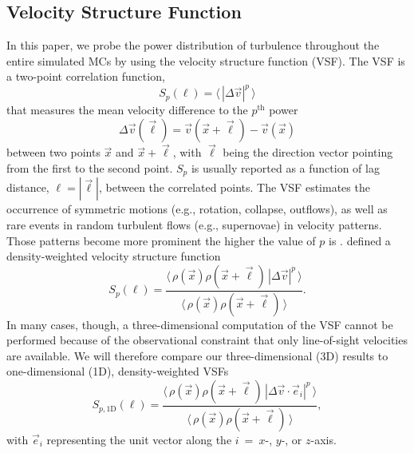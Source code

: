 \documentclass{aa}		%
\begin{document}
\subsection{Velocity Structure Function}\label{methods:vsf}

In this paper, we probe the power distribution of turbulence throughout the entire simulated MCs by using the velocity structure function (VSF).
The VSF is a two-point correlation function,
\begin{equation}
	{S}_p (\ell) = \langle \, |\Delta \vec{v}|^p  \, \rangle
	\label{equ:method:def_vsf}
\end{equation}
that measures the mean velocity difference to the $p^\mathrm{th}$ power
\begin{equation}\Delta \vec{v} (\vec{\ell}) = \vec{v}(\vec{x}+\vec{\ell}) - \vec{v}(\vec{x})
\end{equation} 
between two points $\vec{x}$ and $\vec{x}+\vec{\ell}$, with $\vec{\ell}$ being the direction vector pointing from the first to the second point.  
$S_p$ is usually reported as a function of lag distance, $\ell = |\vec{\ell}|$, between the correlated points.
The VSF estimates the occurrence of symmetric motions (e.g., rotation, collapse, outflows), as well as rare events in random turbulent flows (e.g., supernovae) in velocity patterns.
Those patterns become more prominent the higher the value of $p$ is \citep{Heyer2004}.
\citet{Padoan2016a} defined a density-weighted velocity structure function
\begin{equation}
	{S}_p (\ell) = \frac{\langle \, \rho(\vec{x}) \rho(\vec{x}+\vec{\ell}) \, |\Delta \vec{v}|^p  \, \rangle}{\langle  \, \rho(\vec{x}) \rho(\vec{x}+\vec{\ell}) \, \rangle}.
	\label{equ:method:def_vsf_dw}
\end{equation}
In many cases, though, a three-dimensional computation of the VSF cannot be performed because of the observational constraint that only line-of-sight velocities are available.
We will therefore compare our three-dimensional (3D) results to one-dimensional (1D), density-weighted VSFs
\begin{equation}
	\mathit{S}_{p,\mathrm{1D}} (\ell) = \frac{\langle \, \rho(\vec{x}) \rho(\vec{x}+\vec{\ell}) \, |\Delta 
        \vec{v} \cdot \vec{e}_i|^p  \, \rangle}{\langle  \, \rho(\vec{x}) \rho(\vec{x}+\vec{\ell}) \, \rangle} ,
	\label{equ:results:def_vsf_1d}
\end{equation}
with $\vec{e}_i$ representing the unit vector along the $i$~=~$x$-, $y$-, or $z$-axis.
\end{document}
